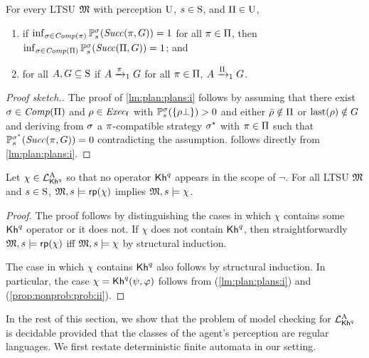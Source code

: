 \begin{lemma}\label{lm:plan:plans}
  For every LTSU $\model$ with perception $\Unc$, $s\in\S$,
  and $\plans\in\Unc$,
  \begin{enumerate}
  \item\label{lm:plan:plans:i}%
    if $\inf_{\strat\in\Comp(\plan)}\Prob^\strat_s(\Succ(\plan,G))=1$
    for all $\plan\in\plans$, then
    $\inf_{\strat\in\Comp(\plans)}\Prob^\strat_s(\Succ(\plans,G))=1$; and
  \item\label{lm:plan:plans:ii}%
    for all $A,G\subseteq\S$ if $A\reach{\plan}_1G$ for all
    $\plan\in\plans$, $A\reach{\plans}_1G$.
  \end{enumerate}

\end{lemma}
%
\begin{proof}[Proof sketch.]
  The proof of \cref{lm:plan:plans:i} follows by assuming that there
  exist $\strat\in\Comp(\plans)$ and $\rho\in\execf$ with
  $\Prob^\strat_s(\{\rho\complete\})>0$ and either
  $\bar{\rho}\notin\plans$ or $\last(\rho)\notin G$ and deriving from
  $\strat$ a $\plan$-compatible strategy $\strat^\star$ with
  $\plan\in\plans$ such that
  $\Prob^{\strat^\star}_s(\Succ(\plan,G))=0$ contradicting the
  assumption.
%
   follows directly from \cref{lm:plan:plans:i}.
\end{proof}


\begin{proposition}\label{prop:Khunc:PKhadapt}
  Let $\chi\in\PKhadapt$ so that no operator $\kh^q$ appears in the
  scope of $\neg$.  For all LTSU $\model$
  and $s\in\S$, $\model,s\models\fgetprob(\chi)$ implies
  $\model,s\models\chi$.
\end{proposition}
%
\begin{proof}
  The proof follows by distinguishing the cases in which $\chi$
  contains some $\kh^q$ operator or it does not.
  If $\chi$ does not contain $\kh^q$, then straightforwardly
  $\model,s\models\fgetprob(\chi)$ iff $\model,s\models\chi$ by
  structural induction.

  The case in which $\chi$ contains $\kh^q$ also
  follows by structural induction.  In particular,
  the case $\chi=\kh^q(\psi,\varphi)$ follows from
   (\cref{lm:plan:plans:i}) and
   (\cref{prop:nonprob:prob:ii}).
\end{proof}

In the rest of this section, we show that the problem of model
checking for $\PKhadapt$ is decidable provided that the classes of the
agent's perception are regular languages.  We first restate
deterministic finite automata in our setting.

